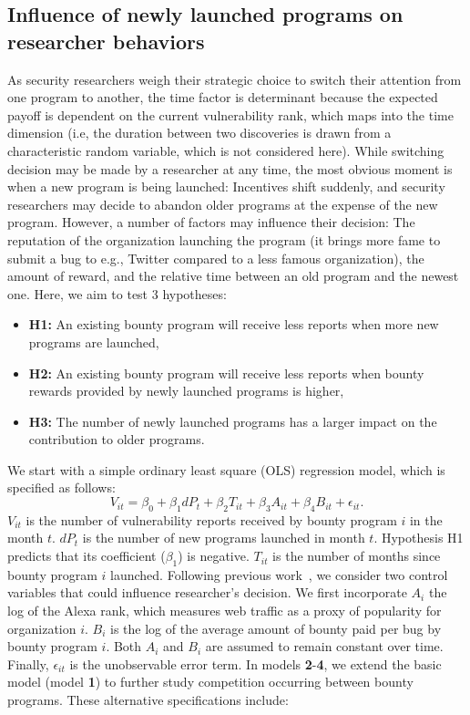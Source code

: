 \subsection{Influence of newly launched programs on researcher behaviors}
\label{ols}
As security researchers weigh their strategic choice to switch their attention from one program to another, the time factor is determinant because the expected payoff is dependent on the current vulnerability rank, which maps into the time dimension (i.e, the duration between two discoveries is drawn from a characteristic random variable, which is not considered here). While switching decision may be made by a researcher at any time, the most obvious moment is when a new program is being launched: Incentives shift suddenly, and security researchers may decide to abandon older programs at the expense of the new program. However, a number of factors may  influence their decision: The reputation of the organization launching the program (it brings more fame to submit a bug to e.g., Twitter compared to a less famous organization), the amount of reward, and the relative time between an old program and the newest one. Here, we aim to test  3 hypotheses:
\begin{itemize}
  \item {\bf H1:} An existing bounty program will receive less reports when more new programs are launched,
  \item {\bf H2:} An existing bounty program will receive less reports when bounty rewards provided by newly launched programs is higher,
  \item {\bf H3:} The number of newly launched programs has a larger impact on the contribution to older programs.
\end{itemize}


We start with a simple ordinary least square (OLS) regression model, which is specified as follows:
\begin{equation}
\label{reg_base}
V_{it} = \beta_0 + \beta_1 dP_t + \beta_2 T_{it} + \beta_3 A_{it} + \beta_4 B_{it} + \epsilon_{it}.
\end{equation}
$V_{it}$ is the number of vulnerability reports received by bounty program $i$ in the month $t$. $dP_t$ is the number of new programs launched in month $t$. Hypothesis H1 predicts that its coefficient ($\beta_1$) is negative. $T_{it}$ is the number of months since bounty program $i$ launched. Following previous work~\cite{zhao2015empirical}, we consider two control variables that could influence researcher's decision. We first incorporate $A_i$ the log of the Alexa rank, which measures web traffic as a proxy of popularity for organization $i$. $B_i$ is the log of the average amount of bounty paid per bug by bounty program $i$. Both $A_i$ and $B_i$ are assumed to remain constant over time. Finally, $\epsilon_{it}$ is the unobservable error term. In models {\bf 2}-{\bf 4}, we extend the basic model (model {\bf 1}) to further study competition occurring between bounty programs. These alternative specifications include:

